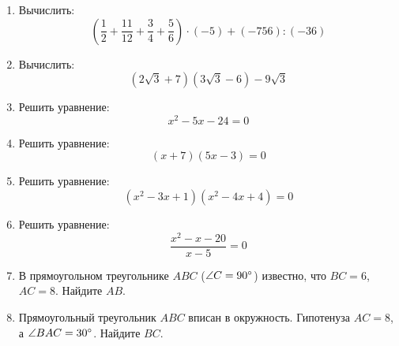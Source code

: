\documentclass[12pt, a4paper]{article}
\begin{document}
		

\begin{enumerate}
	\item Вычислить: $$\left(\dfrac{1}{2}+\dfrac{11}{12}+\dfrac{3}{4}+\dfrac{5}{6}\right)\cdot(-5)+(-756):(-36)$$
	\item Вычислить: $$(2\sqrt{3}+7)(3\sqrt{3}-6)-9\sqrt{3}$$
	\item Решить уравнение:$$x^2-5x-24=0$$
	\item Решить уравнение:$$(x+7)(5x-3)=0$$
	\item Решить уравнение:$$(x^2-3x+1)(x^2-4x+4)=0$$
	\item Решить уравнение:$$\dfrac{x^2-x-20}{x-5}=0$$
	\item В прямоугольном треугольнике $ABC$ ($\angle C = 90\degree$) известно, что $BC = 6$, $AC = 8$. Найдите $AB$.
	\item Прямоугольный треугольник $ABC$ вписан в окружность. Гипотенуза $AC=8$, а $\angle BAC = 30\degree$. Найдите $BC$.
	
\end{enumerate}
\end{document}
